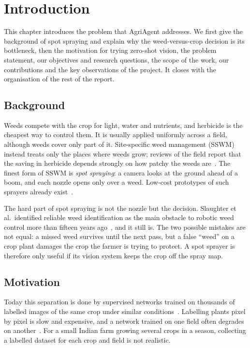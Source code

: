 \chapter{Introduction}\label{ch:intro}

This chapter introduces the problem that AgriAgent addresses. We first give the background of spot
spraying and explain why the weed-versus-crop decision is its bottleneck, then the motivation for
trying zero-shot vision, the problem statement, our objectives and research questions, the scope of
the work, our contributions and the key observations of the project. It closes with the organisation
of the rest of the report.

\section{Background}\label{sec:background}
Weeds compete with the crop for light, water and nutrients, and herbicide is the cheapest way to
control them. It is usually applied uniformly across a field, although weeds cover only part of it.
Site-specific weed management (SSWM) instead treats only the places where weeds grow; reviews of the
field report that the saving in herbicide depends strongly on how patchy the weeds
are~\cite{gerhards2022sswm}. The finest form of SSWM is \emph{spot spraying}: a camera looks at the
ground ahead of a boom, and each nozzle opens only over a weed. Low-cost prototypes of such sprayers
already exist~\cite{partel2019sprayer}.

The hard part of spot spraying is not the nozzle but the decision. Slaughter et al.\ identified
reliable weed identification as the main obstacle to robotic weed control more than fifteen years
ago~\cite{slaughter2008review}, and it still is. The two possible mistakes are not equal: a missed
weed survives until the next pass, but a false ``weed'' on a crop plant damages the crop the farmer is
trying to protect. A spot sprayer is therefore only useful if its vision system keeps the crop off
the spray map.

\section{Motivation}\label{sec:motivation}
Today this separation is done by supervised networks trained on thousands of labelled images of the
same crop under similar conditions~\cite{milioto2018realtime,lottes2018fcn,hasan2021survey}. Labelling
plants pixel by pixel is slow and expensive, and a network trained on one field often degrades on
another~\cite{weyler2023domain}. For a small Indian farm growing several crops in a season, collecting
a labelled dataset for each crop and field is not realistic.

